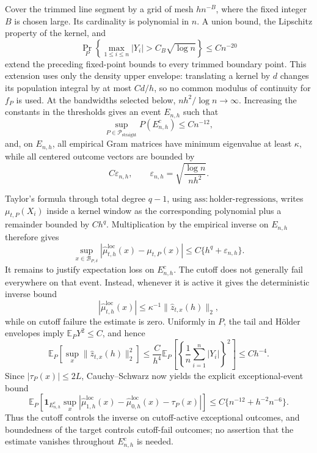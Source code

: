 Cover the trimmed line segment by a grid of mesh \(h n^{-B}\), where the fixed integer \(B\) is chosen large.  Its cardinality is polynomial in \(n\).  A union bound, the Lipschitz property of the kernel, and
\[
 \Pr_P\!\left\{\max_{1\leq i\leq n}|Y_i|>C_B\sqrt{\log n}\right\}\leq Cn^{-20}
\]
extend the preceding fixed-point bounds to every trimmed boundary point.  This extension uses only the density upper envelope: translating a kernel by \(d\) changes its population integral by at most \(C d/h\), so no common modulus of continuity for \(f_P\) is used.  At the bandwidths selected below, \(nh^2/\log n\to\infty\).  Increasing the constants in the thresholds gives an event \(E_{n,h}\) such that
\[
 \sup_{P\in\mathcal P_{\mathrm{straight}}}P(E_{n,h}^{c})\leq Cn^{-12},
\]
and, on \(E_{n,h}\), all empirical Gram matrices have minimum eigenvalue at least \(\kappa\), while all centered outcome vectors are bounded by
\[
 C\varepsilon_{n,h},\qquad
 \varepsilon_{n,h}=\sqrt{\frac{\log n}{nh^2}}.
\]

Taylor's formula through total degree \(q-1\), using \(\mathrm{ass:holder\text{-}regressions}\), writes \(\mu_{t,P}(X_i)\) inside a kernel window as the corresponding polynomial plus a remainder bounded by \(Ch^q\).  Multiplication by the empirical inverse on \(E_{n,h}\) therefore gives
\[
 \sup_{x\in\mathcal B_{P,\delta}}
 |\widehat\mu^{\mathrm{loc}}_{t,h}(x)-\mu_{t,P}(x)|
 \leq C\{h^q+\varepsilon_{n,h}\}.
\]
It remains to justify expectation loss on \(E_{n,h}^{c}\).  The cutoff does not generally fail everywhere on that event.  Instead, whenever it is active it gives the deterministic inverse bound
\[
 |\widehat\mu^{\mathrm{loc}}_{t,h}(x)|
 \leq\kappa^{-1}\lVert\widehat z_{t,x}(h)\rVert_2,
\]
while on cutoff failure the estimate is zero.  Uniformly in \(P\), the tail and H\"older envelopes imply \(\mathbb E_PY^2\leq C\), and hence
\[
 \mathbb E_P\!\left[\sup_x\lVert\widehat z_{t,x}(h)\rVert_2^2\right]
 \leq \frac{C}{h^4}\mathbb E_P\!\left[\left\{\frac1n\sum_{i=1}^n|Y_i|\right\}^2\right]
 \leq Ch^{-4}.
\]
Since \(|\tau_P(x)|\leq2L\), Cauchy--Schwarz now yields the explicit exceptional-event bound
\[
 \mathbb E_P\!\left[
 \mathbf 1_{E_{n,h}^{c}}
 \sup_x|\widehat\mu^{\mathrm{loc}}_{1,h}(x)
 -\widehat\mu^{\mathrm{loc}}_{0,h}(x)-\tau_P(x)|\right]
 \leq C\{n^{-12}+h^{-2}n^{-6}\}.
\]
Thus the cutoff controls the inverse on cutoff-active exceptional outcomes, and boundedness of the target controls cutoff-fail outcomes; no assertion that the estimate vanishes throughout \(E_{n,h}^{c}\) is needed.

